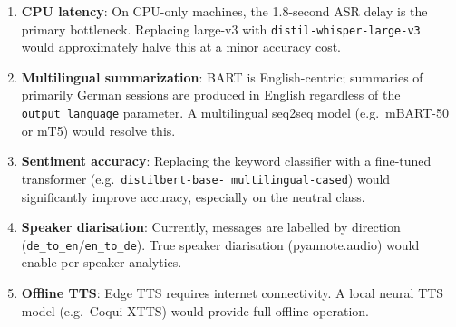 \documentclass[12pt,a4paper]{report}
\begin{document}
\begin{enumerate}
  \item \textbf{CPU latency}: On CPU-only machines, the 1.8-second ASR
        delay is the primary bottleneck. Replacing large-v3 with
        \texttt{distil-whisper-large-v3} would approximately halve
        this at a minor accuracy cost.
  \item \textbf{Multilingual summarization}: BART is English-centric;
        summaries of primarily German sessions are produced in English
        regardless of the \texttt{output\_language} parameter. A
        multilingual seq2seq model (e.g.\ mBART-50 or mT5) would
        resolve this.
  \item \textbf{Sentiment accuracy}: Replacing the keyword classifier
        with a fine-tuned transformer (e.g.\ \texttt{distilbert-base-
        multilingual-cased}) would significantly improve accuracy,
        especially on the neutral class.
  \item \textbf{Speaker diarisation}: Currently, messages are labelled
        by direction (\texttt{de\_to\_en}/\texttt{en\_to\_de}). True
        speaker diarisation (pyannote.audio) would enable per-speaker
        analytics.
  \item \textbf{Offline TTS}: Edge TTS requires internet connectivity.
        A local neural TTS model (e.g.\ Coqui XTTS) would provide
        full offline operation.
\end{enumerate}
\end{document}
